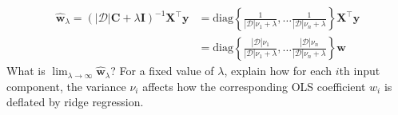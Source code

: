 \documentclass{article}
\numberwithin{equation}{section}
\begin{document}
\begin{enumerate}
\begin{equation*}
        \begin{split}
            \hat{\mathbf{w}}_\lambda =
            (|\mathcal{D}|\mathbf{C} + \lambda\mathbf{I})^{-1}
            \mathbf{X}^\top\mathbf{y} & =
            \mathrm{diag}\left\{
                \frac{1}{|\mathcal{D}|\nu_1 + \lambda}, \ldots
                \frac{1}{|\mathcal{D}|\nu_n + \lambda}
            \right\}\mathbf{X}^\top\mathbf{y} \\
            & = \mathrm{diag}\left\{
                \frac{|\mathcal{D}|\nu_1}{|\mathcal{D}|\nu_1 + \lambda},
                \ldots \frac{|\mathcal{D}|\nu_n}{|\mathcal{D}|\nu_n + \lambda}
            \right\}\hat{\mathbf{w}}
        \end{split}
    \end{equation*}
    What is $ \lim_{\lambda \rightarrow \infty}\hat{\mathbf{w}}_\lambda $? For
    a fixed value of $ \lambda $, explain how for each $ i $th input component,
    the variance $ \nu_i $ affects how the corresponding OLS coefficient $ w_i $
    is deflated by ridge regression.


\end{enumerate}
\end{document}
